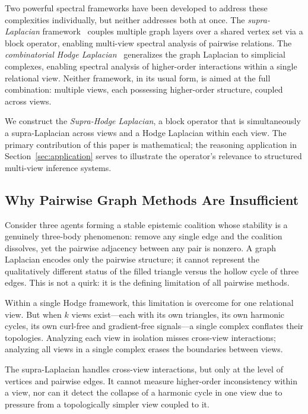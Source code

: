 \documentclass[11pt]{article}
\theoremstyle{definition}
\theoremstyle{remark}
\begin{document}
Two powerful spectral frameworks have been developed to address these
complexities individually, but neither addresses both at once. The
\emph{supra-Laplacian} framework~\cite{gomez2013,dedomenico2013} couples
multiple graph layers over a shared vertex set via a block operator, enabling
multi-view spectral analysis of pairwise relations. The \emph{combinatorial
Hodge Laplacian}~\cite{horak2013,schaub2020,lim2020} generalizes the graph
Laplacian to simplicial complexes, enabling spectral analysis of higher-order
interactions within a single relational view. Neither framework, in its usual form, is aimed at the full combination:
multiple views, each possessing higher-order structure, coupled across views.

We construct the \emph{Supra-Hodge Laplacian}, a block operator that is
simultaneously a supra-Laplacian across views and a Hodge Laplacian within each
view. The primary contribution of this paper is
mathematical; the reasoning application in Section~\ref{sec:application} serves
to illustrate the operator's relevance to structured multi-view inference
systems.

\subsection{Why Pairwise Graph Methods Are Insufficient}
\label{subsec:insufficient}

Consider three agents forming a stable epistemic coalition whose stability is a
genuinely three-body phenomenon: remove any single edge and the coalition
dissolves, yet the pairwise adjacency between any pair is nonzero. A graph
Laplacian encodes only the pairwise structure; it cannot represent the
qualitatively different status of the filled triangle versus the hollow cycle
of three edges. This is not a quirk: it is the defining limitation of all
pairwise methods.

Within a single Hodge framework, this limitation is overcome for one relational
view. But when $k$ views exist---each with its own triangles, its own harmonic
cycles, its own curl-free and gradient-free signals---a single complex conflates
their topologies. Analyzing each view in isolation misses cross-view
interactions; analyzing all views in a single complex erases the boundaries
between views.

The supra-Laplacian handles cross-view interactions, but only at the level of
vertices and pairwise edges. It cannot measure higher-order inconsistency
within a view, nor can it detect the collapse of a harmonic cycle in one view
due to pressure from a topologically simpler view coupled to it.
\end{document}
